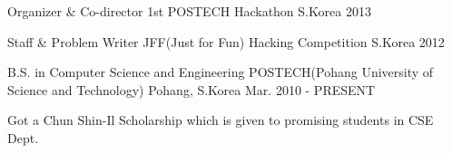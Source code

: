 

\begin{cvhonors}

  \cvhonor
    {Organizer \& Co-director} %
    {1st POSTECH Hackathon} %
    {S.Korea} %
    {2013} %

  \cvhonor
    {Staff \& Problem Writer} %
    {JFF(Just for Fun) Hacking Competition} %
    {S.Korea} %
    {2012} %

\end{cvhonors}


\begin{cventries}

  \cventry
    {B.S. in Computer Science and Engineering} %
    {POSTECH(Pohang University of Science and Technology)} %
    {Pohang, S.Korea} %
    {Mar. 2010 - PRESENT} %
    {
      \begin{cvitems} %
        \item {Got a Chun Shin-Il Scholarship which is given to promising students in CSE Dept.}
      \end{cvitems}
    }

\end{cventries}


